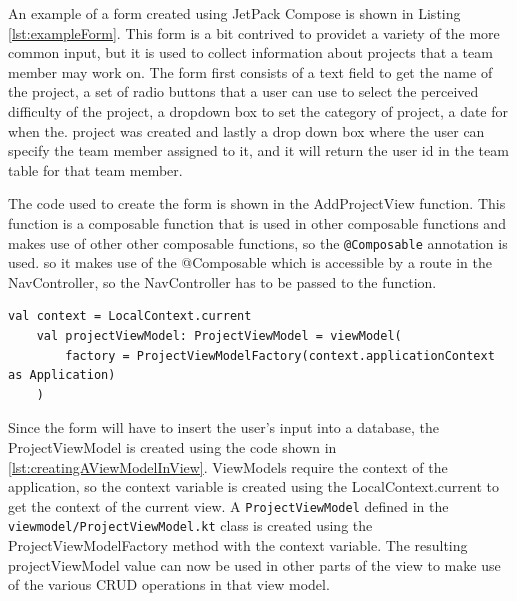 \documentclass[12pt]{article}
\begin{document}
An example of a form created using JetPack Compose is shown in Listing \ref{lst:exampleForm}. This form is a bit contrived to providet a variety of the more common input, but it is used to collect information about projects that a team member may work on. The form first consists of a text field to get the name of the project, a set of radio buttons that a user can use to select the perceived difficulty of the project, a dropdown box to set the category of project, a date for when the. project was created and lastly a drop down box where the user can specify the team member assigned to it, and it will return the user id in the team table for that team member. 


The code used to create the form is shown in the AddProjectView function. This function is a composable function that is used in other composable functions and makes use of other other composable functions, so the \verb|@Composable| annotation is used. so it makes use of the @Composable which is accessible by a route in the NavController, so the NavController has to be passed to the function. 
\begin{lstlisting}[numbers=none, 
			caption=Creating a ViewModel in a View,
			label={lst:creatingAViewModelInView}]
    val context = LocalContext.current
    val projectViewModel: ProjectViewModel = viewModel(
        factory = ProjectViewModelFactory(context.applicationContext as Application)
    )
\end{lstlisting}

Since the form will have to insert the user's input into a database, the ProjectViewModel is created using the code shown in \ref{lst:creatingAViewModelInView}. ViewModels require the context of the application, so the context variable is created using the LocalContext.current to get the context of the current view. A \verb|ProjectViewModel| defined in the \verb|viewmodel/ProjectViewModel.kt| class is created using the ProjectViewModelFactory method with the context variable. The resulting projectViewModel value can now be used in other parts of the view to make use of the various CRUD operations in that view model. 
\end{document}
